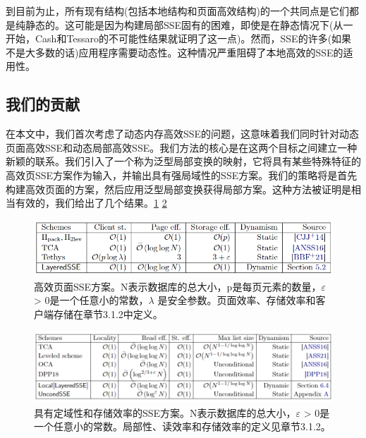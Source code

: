 \documentclass[UTF8]{article}
\begin{document}
到目前为止，所有现有结构(包括本地结构和页面高效结构)的一个共同点是它们都是纯静态的。这可能是因为构建局部SSE固有的困难，即使是在静态情况下(从一开始，Cash和Tessaro的不可能性结果就证明了这一点\cite{DavidCash2014TheLO})。然而，SSE的许多(如果不是大多数的话)应用程序需要动态性。这种情况严重阻碍了本地高效的SSE的适用性。
\subsection{我们的贡献}
在本文中，我们首次考虑了动态内存高效SSE的问题，这意味着我们同时针对动态页面高效SSE和动态局部高效SSE。我们方法的核心是在这两个目标之间建立一种新颖的联系。我们引入了一个称为泛型局部变换的映射，它将具有某些特殊特征的高效页SSE方案作为输入，并输出具有强局域性的SSE方案。我们的策略将是首先构建高效页面的方案，然后应用泛型局部变换获得局部方案。这种方法被证明是相当有效的，我们给出了几个结果。\ref{table1} \ref{table2}
\begin{figure}[ht]
  \centering
  \includegraphics[scale=0.5]{table1.png}
  \caption{高效页面SSE方案。N表示数据库的总大小，p是每页元素的数量，$\varepsilon$ > 0是一个任意小的常数，$\lambda$ 是安全参数。页面效率、存储效率和客户端存储在章节3.1.2中定义。}
  \label{table1} %
\end{figure}

\begin{figure}[ht]
  \centering
  \includegraphics[scale=0.4]{table2.png}
  \caption{具有定域性和存储效率的SSE方案。N表示数据库的总大小，$\varepsilon$ > 0是一个任意小的常数。局部性、读效率和存储效率的定义见章节3.1.2。}
  \label{table2} %
\end{figure}
\end{document}
